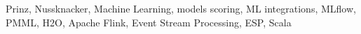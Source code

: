 Prinz, Nussknacker, Machine Learning, models scoring, ML integrations, MLflow, PMML, H2O, Apache Flink, Event Stream Processing, ESP, Scala
